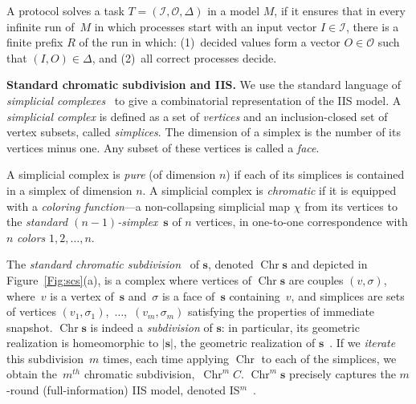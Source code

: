 \documentclass[a4paper]{article}
\newcommand{\myparagraph}[1]{\vspace{6pt}\noindent \textbf{#1}}
\def\I{\ensuremath{\mathcal{I}}}
\def\O{\ensuremath{\mathcal{O}}}
\def\s {\mathbf{s}}
\def\Chr{\operatorname{Chr}}
\def\O {\mathcal{O}}
\def\I {\mathcal{I}}
\begin{document}
A protocol solves a task $T=(\I,\O,\Delta)$ in a model $M$, 
if it ensures that in every infinite run of~$M$ in which 
processes start with an input vector $I\in\I$, there is a finite
prefix $R$ of the run in which: (1)~decided values form a 
vector $O\in\O$ such that $(I,O)\in\Delta$, and (2)~all 
correct processes decide. 

\myparagraph{Standard chromatic subdivision and IIS.}
%
We use the standard language of \emph{simplicial
  complexes}~\cite{Spanier,HKR14} to give a combinatorial
representation of the IIS model. 
A \emph{simplicial complex} is defined as a set of 
\emph{vertices} and an inclusion-closed set of vertex subsets, 
called \emph{simplices}. The dimension of a simplex is 
the number of its vertices minus one. Any subset of these 
vertices is called a \emph{face}. 


A simplicial complex is \emph{pure} (of dimension $n$) if each of its simplices 
is contained in a simplex of dimension $n$.
A simplicial complex is \emph{chromatic} if it is equipped with 
a \emph{coloring function}---a non-collapsing simplicial map $\chi$ from its vertices to 
the {\em standard $(n-1)$-simplex}~$\s$ of $n$ vertices, in 
one-to-one correspondence with $n$ {\em colors} $1,2, \dots, n$. 
%

The \emph{standard chromatic subdivision}~\cite{HS99} of $\s$, denoted
$\Chr\s$ and depicted in Figure~\ref{Fig:scs}(a), is a complex where vertices of $\Chr\s$ are couples $(v, \sigma)$, where~$v$ is a 
vertex of~$\s$ and~$\sigma$ is a face of~$\s$ containing~$v$, and
simplices are sets of vertices
$(v_1,\sigma_1)$,~$\ldots$,~$(v_m,\sigma_m)$  satisfying the
properties of immediate snapshot. 
%
$\Chr\s$ is indeed a \emph{subdivision} of $\s$: in particular, 
its geometric realization is homeomorphic to $|\s|$, the geometric realization of $\s$~\cite{Koz12}.
%
If we \emph{iterate} this subdivision~$m$ times, each time 
applying $\Chr$ to each of the simplices, we 
obtain the~$m^{th}$ chromatic subdivision,~$\Chr^m C$.
$\Chr^m \s$ precisely captures  the $m$-round 
(full-information) IIS model, denoted IS$^m$~\cite{HS99}.
\end{document}
